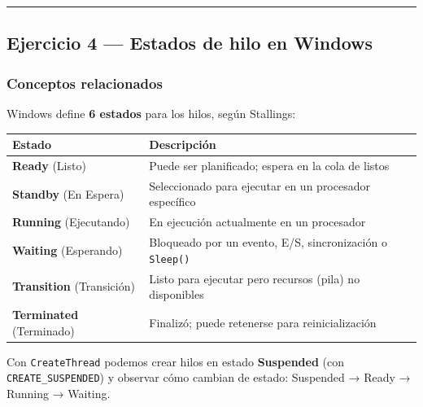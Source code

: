 \documentclass[
  spanish,
]{article}
\newcounter{none} %
\begin{document}
\begin{center}\rule{0.5\linewidth}{0.5pt}\end{center}

\subsection{Ejercicio 4 --- Estados de hilo en
Windows}\label{ejercicio-4-estados-de-hilo-en-windows}

\subsubsection{Conceptos relacionados}\label{conceptos-relacionados-1}

Windows define \textbf{6 estados} para los hilos, según Stallings:

{\def\LTcaptype{none} %
\begin{longtable}[]{@{}
  >{\raggedright\arraybackslash}p{}
  >{\raggedright\arraybackslash}p{}@{}}
\toprule\noalign{}
\begin{minipage}[b]{\linewidth}\raggedright
Estado
\end{minipage} & \begin{minipage}[b]{\linewidth}\raggedright
Descripción
\end{minipage} \\
\midrule\noalign{}
\endhead
\bottomrule\noalign{}
\endlastfoot
\textbf{Ready} (Listo) & Puede ser planificado; espera en la cola de
listos \\
\textbf{Standby} (En Espera) & Seleccionado para ejecutar en un
procesador específico \\
\textbf{Running} (Ejecutando) & En ejecución actualmente en un
procesador \\
\textbf{Waiting} (Esperando) & Bloqueado por un evento, E/S,
sincronización o \texttt{Sleep()} \\
\textbf{Transition} (Transición) & Listo para ejecutar pero recursos
(pila) no disponibles \\
\textbf{Terminated} (Terminado) & Finalizó; puede retenerse para
reinicialización \\
\end{longtable}
}

Con \texttt{CreateThread} podemos crear hilos en estado
\textbf{Suspended} (con \texttt{CREATE\_SUSPENDED}) y observar cómo
cambian de estado: Suspended → Ready → Running → Waiting.
\end{document}
